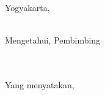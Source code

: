 \begin{flushright}
    Yogyakarta, \tglpernyataan\\
\end{flushright}
\begin{minipage}{0.4\textwidth}
    \begin{center}
        \hfill\\[2em]
        Mengetahui, Pembimbing\\[2cm]
        \pembimbing\\
        \NIPpembimbing
    \end{center}
\end{minipage}
\hfill
\begin{minipage}{0.47\textwidth}
    \begin{center}
        \hfill\\[2em]
        Yang menyatakan,\\[2.5cm]
        \penulis\\
        \nim
    \end{center}
\end{minipage}
